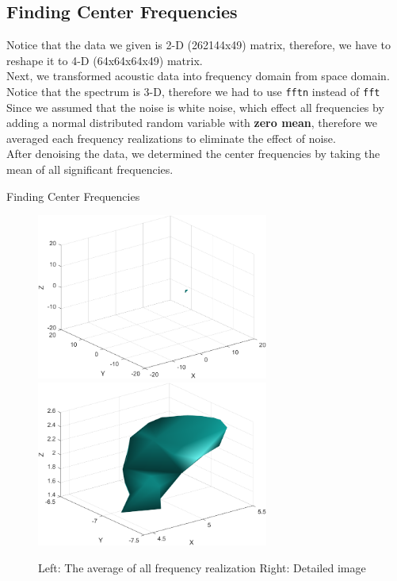 \documentclass{article}
\begin{document}
\subsection{Finding Center Frequencies}
Notice that the data we given is 2-D (262144x49) matrix, therefore, we have to reshape it to 4-D (64x64x64x49) matrix.\\
Next, we transformed acoustic data into frequency domain from space domain. Notice that the spectrum is 3-D, therefore we had to use \texttt{fftn} instead of \texttt{fft} \\
Since we assumed that the noise is white noise, which effect all frequencies by adding a normal distributed random variable with \textbf{zero mean}, therefore we averaged each frequency realizations to eliminate the effect of noise.\\
After denoising the data, we determined the center frequencies by taking the mean of all significant frequencies. \\


\begin{algorithm}
\begin{algorithmic}
    \ENDFOR
\end{algorithmic}
\caption{Finding Center Frequencies}
\end{algorithm}
\begin{figure}[h]
    \centerline{\includegraphics[width=3in]{centf.png}\includegraphics[width=3in]{centf2.png}}
    \caption{Left: The average of all frequency realization \quad Right: Detailed image}
\end{figure}
\end{document}
